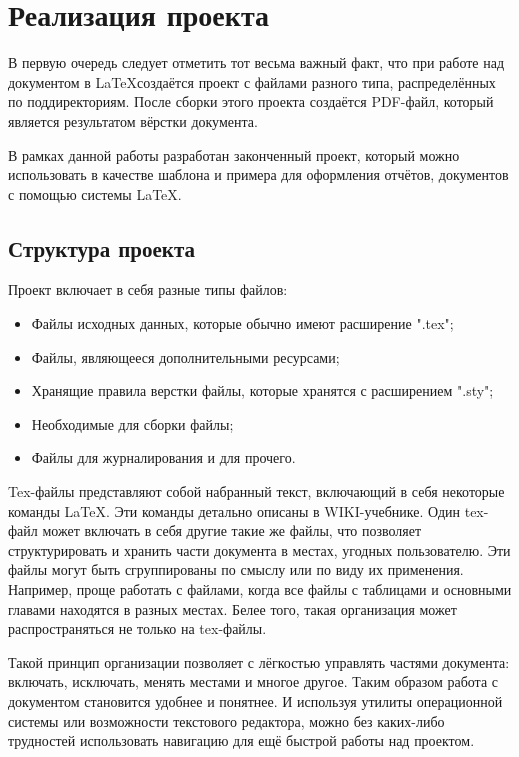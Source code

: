 \section{ Реализация проекта}
	В первую очередь следует отметить тот весьма важный факт, что при работе над документом в \LaTeX создаётся проект
	с файлами разного типа, распределённых по поддиректориям. После сборки этого проекта создаётся PDF-файл, который
	является результатом вёрстки документа\cite{norm2}.

	В рамках данной работы разработан законченный проект, который можно использовать в качестве шаблона и примера
	для оформления отчётов, документов с помощью системы \LaTeX.

	\subsection{Структура проекта}
		Проект включает в себя разные типы  файлов:
			\begin{itemize}
				\fontsize{0pt}{0pt}
				\setlength{\itemsep}{0pt}
				\item Файлы исходных данных, которые обычно имеют расширение ".tex"; 
				\item Файлы, являющееся дополнительными ресурсами;
				\item Хранящие правила верстки файлы, которые хранятся с расширением ".sty";
				\item Необходимые для сборки файлы;
				\item Файлы для журналирования и для прочего.
			\end{itemize}

			Tex-файлы представляют собой набранный текст, включающий в себя некоторые команды \LaTeX. Эти команды детально описаны
			в WIKI-учебнике. Один tex-файл может включать в себя другие такие же файлы, что позволяет структурировать и хранить 
			части документа в местах, угодных пользователю. Эти файлы могут быть сгруппированы по смыслу или по виду их 
			применения. Например, проще работать с файлами, когда все файлы с таблицами и основными главами находятся в
			разных местах. Белее того, такая организация может распространяться не только на tex-файлы.

			Такой принцип организации позволяет с лёгкостью управлять частями документа: включать, исключать, менять местами и многое другое.
			Таким образом работа с документом становится удобнее и понятнее. И используя утилиты операционной системы или возможности
			текстового редактора, можно без каких-либо трудностей использовать навигацию для ещё быстрой работы над проектом.

